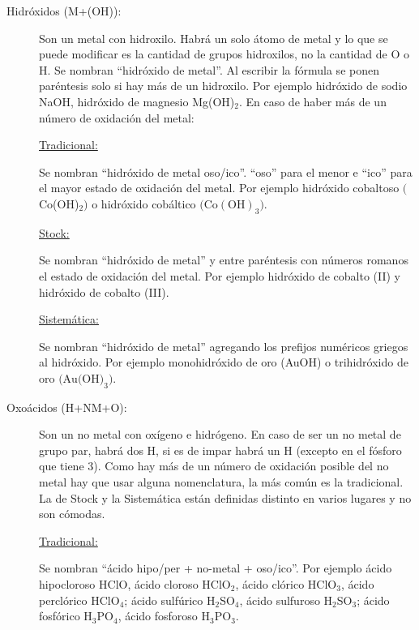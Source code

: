 \begin{description}

\item[Hidróxidos \Big(M+(OH)\Big):]\hfill

    Son un metal con hidroxilo. Habrá un solo átomo de metal y lo que se puede modificar es la cantidad de grupos hidroxilos, no la cantidad de O o H. Se nombran ``hidróxido de metal''. Al escribir la fórmula se ponen paréntesis solo si hay más de un hidroxilo. Por ejemplo hidróxido de sodio NaOH, hidróxido de magnesio Mg(OH)$_2$. En caso de haber más de un número de oxidación del metal:

    \underline{Tradicional:}
    
    Se nombran ``hidróxido de metal oso/ico''. ``oso'' para el menor e ``ico'' para el mayor estado de oxidación del metal. Por ejemplo hidróxido cobaltoso $\Big($Co(OH)$_2\Big)$ o hidróxido cobáltico $\Big(\text{Co}(\text{OH})_3\big)$.
    
    \underline{Stock:}
    
    Se nombran ``hidróxido de metal'' y entre paréntesis con números romanos el estado de oxidación del metal. Por ejemplo hidróxido de cobalto (II) y hidróxido de cobalto (III).
    
    \underline{Sistemática:}
    
    Se nombran ``hidróxido de metal'' agregando los prefijos numéricos griegos al hidróxido. Por ejemplo monohidróxido de oro (AuOH) o trihidróxido de oro $\Big( \text{Au(OH)}_3 \Big)$.





\item[Oxoácidos (H+NM+O):]\hfill
    
    Son un no metal con oxígeno e hidrógeno. En caso de ser un no metal de grupo par, habrá dos H, si es de impar habrá un H (excepto en el fósforo que tiene 3). Como hay más de un número de oxidación posible del no metal hay que usar alguna nomenclatura, la más común es la tradicional. La de Stock y la Sistemática están definidas distinto en varios lugares y no son cómodas.
    
    \underline{Tradicional:}
    
    Se nombran ``ácido hipo/per + no-metal + oso/ico''. Por ejemplo ácido hipocloroso HClO, ácido cloroso HClO$_2$, ácido clórico HClO$_3$, ácido perclórico HClO$_4$; ácido sulfúrico H$_2$SO$_4$, ácido sulfuroso H$_2$SO$_3$; ácido fosfórico H$_3$PO$_4$, ácido fosforoso H$_3$PO$_3$.    




\end{description}
